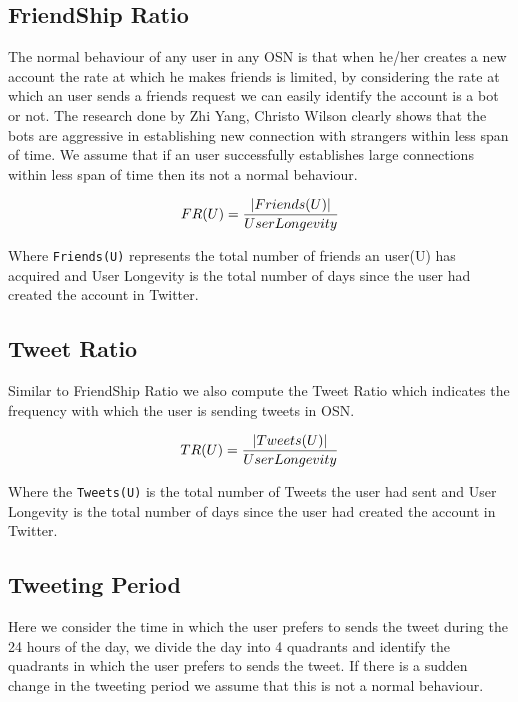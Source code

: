 \documentclass[conference]{IEEEtran}
\begin{document}
\subsection{FriendShip Ratio}
The normal behaviour of any user in any OSN is that when he/her creates a new account the rate at which he makes friends is limited, by considering the rate at which an user sends a friends request we can easily identify the account is a bot or not. The research done by Zhi Yang, Christo Wilson clearly shows that the bots are aggressive in establishing new connection with strangers within less span of time. We assume that if an user successfully establishes large connections within less span of time then its not a normal behaviour.

\begin{equation}
	 FR (U) = \frac{|Friends(U)|}{User Longevity} \\
\end{equation}

Where \verb |Friends(U)| represents the total number of friends an user(U) has acquired and User Longevity is the total number of days since the user had created the account in Twitter. 

\subsection{Tweet Ratio}
Similar to FriendShip Ratio we also compute the Tweet Ratio which indicates the frequency with which the user is sending tweets in OSN.
	
\begin{equation}
	 TR (U) = \frac{|Tweets(U)|}{User Longevity} \\
\end{equation}	

Where the \verb |Tweets(U)| is the total number of Tweets the user had sent and User Longevity is the total number of days since the user had created the account in Twitter.

\subsection{Tweeting Period}
Here we consider the time in which the user prefers to sends the tweet during the 24 hours of the day, we divide the day into 4 quadrants and identify the quadrants in which the user prefers to sends the tweet. If there is a sudden change in the tweeting period we assume that this is not a normal behaviour. \\
\end{document}
